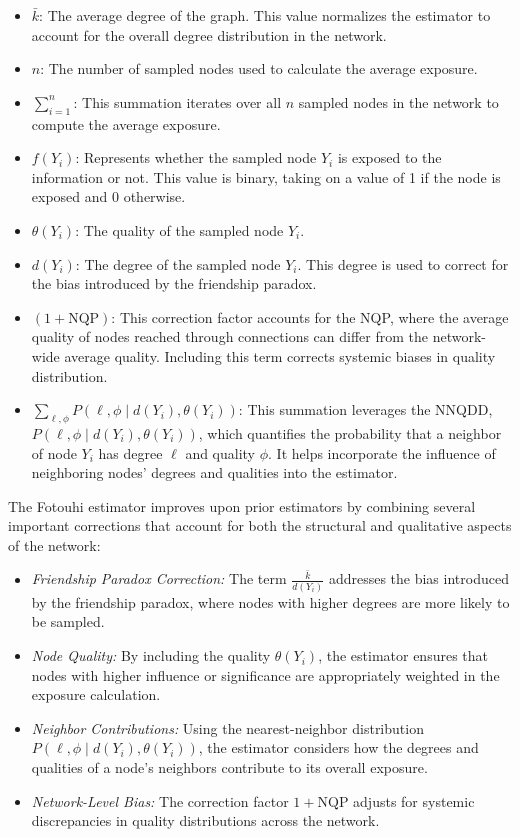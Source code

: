 \documentclass{article}
\begin{document}
\begin{itemize} [itemsep=\parskip, topsep=0pt]
    \item \(\bar{k}\): The average degree of the graph. This value normalizes the estimator to account for the overall degree distribution in the network.
    \item \(n\): The number of sampled nodes used to calculate the average exposure.
    \item \(\sum_{i=1}^n\): This summation iterates over all \(n\) sampled nodes in the network to compute the average exposure.
    \item \(f(Y_i)\): Represents whether the sampled node \(Y_i\) is exposed to the information or not. This value is binary, taking on a value of 1 if the node is exposed and 0 otherwise.
    \item \(\theta(Y_i)\): The quality of the sampled node \(Y_i\). 
    \item \(d(Y_i)\): The degree of the sampled node \(Y_i\). This degree is used to correct for the bias introduced by the friendship paradox.
    \item \((1 + \text{NQP})\): This correction factor accounts for the NQP, where the average quality of nodes reached through connections can differ from the network-wide average quality. Including this term corrects systemic biases in quality distribution.
    \item \(\sum_{\ell, \phi} P(\ell, \phi \mid d(Y_i), \theta(Y_i))\): This summation leverages the NNQDD, \(P(\ell, \phi \mid d(Y_i), \theta(Y_i))\), which quantifies the probability that a neighbor of node \(Y_i\) has degree \(\ell\) and quality \(\phi\). It helps incorporate the influence of neighboring nodes' degrees and qualities into the estimator.
\end{itemize}

The Fotouhi estimator improves upon prior estimators by combining several important corrections that account for both the structural and qualitative aspects of the network:

\begin{itemize} [itemsep=\parskip, topsep=0pt]
    \item \textit{Friendship Paradox Correction:} The term \(\frac{\bar{k}}{d(Y_i)}\) addresses the bias introduced by the friendship paradox, where nodes with higher degrees are more likely to be sampled.
    \item \textit{Node Quality:} By including the quality \(\theta(Y_i)\), the estimator ensures that nodes with higher influence or significance are appropriately weighted in the exposure calculation.
    \item \textit{Neighbor Contributions:} Using the nearest-neighbor distribution \(P(\ell, \phi \mid d(Y_i), \theta(Y_i))\), the estimator considers how the degrees and qualities of a node’s neighbors contribute to its overall exposure.
    \item \textit{Network-Level Bias:} The correction factor \(1 + \text{NQP}\) adjusts for systemic discrepancies in quality distributions across the network.
\end{itemize}
\end{document}
